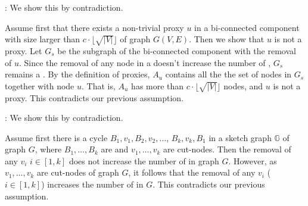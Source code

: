 : We show this by contradiction.

Assume first that there exists a non-trivial proxy $u$ in a bi-connected component with size larger than $c \cdot\lfloor\sqrt{|V|}\rfloor$ of graph $G(V, E)$.
Then we show that $u$ is not a proxy. Let $G_s$ be the subgraph of the bi-connected component with the removal of $u$. Since the removal of any node in a \bc doesn't increase the number of \ccs, $G_s$ remains a \cc. By the definition of proxies, $A_u$ contains all the  the set of nodes in $G_s$ together with node $u$. That is, $A_u$ has more than $c \cdot\lfloor\sqrt{|V|}\rfloor$ nodes, and $u$ is not a proxy. This contradicts our previous assumption.
\eop


: We show this by contradiction. 

Assume first there is a cycle $B_1, v_1, B_2, v_2, \ldots$, $B_k, v_k, B_1$ in a sketch graph $\mathbb{G}$ of graph $G$, where $B_1, \ldots, B_k$ are \bccs and $v_1, \ldots, v_k$ are cut-nodes. Then the removal of any $v_i$ $i\in[1, k]$ does not increase the number of \ccs in graph $G$.
%
However, as $v_1, \ldots, v_k$ are cut-nodes of graph $G$, it follows that the removal of any $v_i$ ($i\in[1, k]$) increases the number of \ccs in $G$.
This contradicts our previous assumption.
\eop
